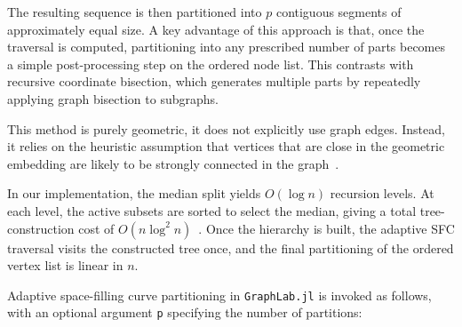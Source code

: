 
    The resulting sequence is then partitioned into $p$ contiguous segments of approximately equal size.
    A key advantage of this approach is that, once the traversal is computed, partitioning into any prescribed number of parts becomes a simple post-processing step on the ordered node list. This contrasts with recursive coordinate bisection, which generates multiple parts by repeatedly applying graph bisection to subgraphs.

    This method is purely geometric, it does not explicitly use graph edges. Instead, it relies on the heuristic assumption that vertices that are close in the geometric embedding are likely to be strongly connected in the graph~\cite{elsner1997graph, doi:10.1137/S1064827594275339}.

    In our implementation, the median split yields $O(\log n)$ recursion levels.
    At each level, the active subsets are sorted to select the median, giving a total tree-construction cost of \(O(n\log^2 n)\)~\cite{4061547}.
    Once the hierarchy is built, the adaptive SFC traversal visits the constructed tree once, and the final partitioning of the ordered vertex list is linear in $n$. 

    Adaptive space-filling curve partitioning in \texttt{GraphLab.jl} is invoked as follows, with an optional argument \texttt{p} specifying the number of partitions:
    
